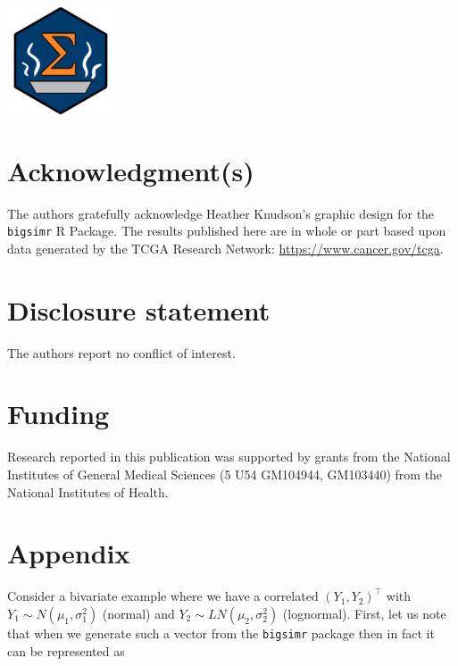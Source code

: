 \documentclass[
]{jss}
\begin{document}
\begin{CodeChunk}


\begin{center}\includegraphics[width=0.05\linewidth]{images/hex-bigsimr} \end{center}

\end{CodeChunk}

\hypertarget{acknowledgments}{%
\section*{Acknowledgment(s)}\label{acknowledgments}}

The authors gratefully acknowledge Heather Knudson's graphic design for the \texttt{bigsimr} R Package. The results published here are in whole or part based upon data generated by the TCGA Research Network: \url{https://www.cancer.gov/tcga}.

\hypertarget{coi}{%
\section*{Disclosure statement}\label{coi}}

The authors report no conflict of interest.

\hypertarget{funding}{%
\section*{Funding}\label{funding}}

Research reported in this publication was supported by grants from the National Institutes of General Medical Sciences (5 U54 GM104944, GM103440) from the National Institutes of Health.

\hypertarget{appendix}{%
\section*{Appendix}\label{appendix}}

\noindent Consider a bivariate example where we have a correlated \((Y_1, Y_2)^\top\) with \(Y_1\sim N(\mu_1, \sigma_1^2)\) (normal) and \(Y_2\sim LN(\mu_2, \sigma_2^2)\) (lognormal). First, let us note that when we generate such a vector from the \texttt{bigsimr} package then in fact it can be represented as
\end{document}
